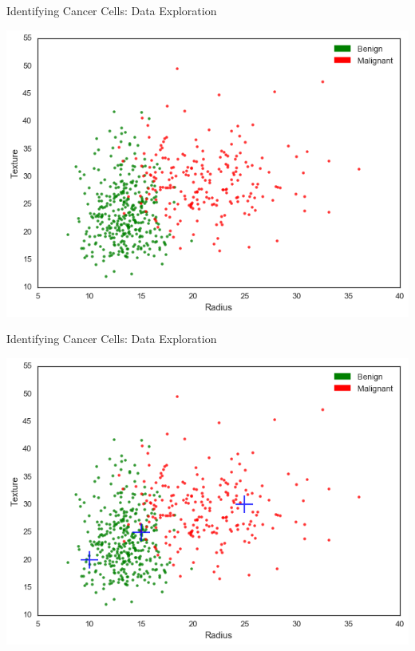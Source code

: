 \documentclass[8pt,aspectratio=169]{beamer}
\begin{document}

\begin{frame}{Identifying Cancer Cells: Data Exploration}

\begin{center}
\includegraphics[scale=0.40]{figures/cancer-scatter-plot-by-class}
\end{center}

\end{frame}


\begin{frame}{Identifying Cancer Cells: Data Exploration}

\begin{center}
\includegraphics[scale=0.40]{figures/cancer-scatter-plot-examples}
\end{center}

\end{frame}
\end{document}
